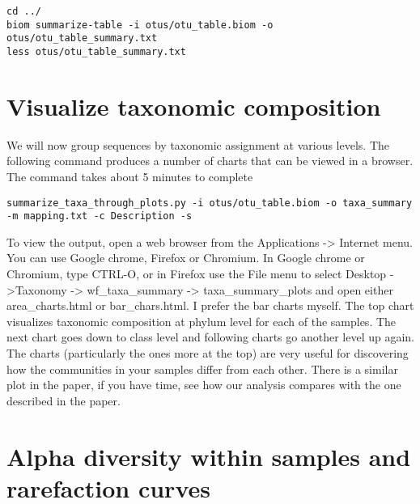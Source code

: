 \begin{steps}
\begin{lstlisting}
cd ../
biom summarize-table -i otus/otu_table.biom -o otus/otu_table_summary.txt
less otus/otu_table_summary.txt
\end{lstlisting}
\end{steps}

\section{Visualize taxonomic composition}
We will now group sequences by taxonomic assignment at various levels. The following command produces a number of charts that can be viewed in a browser. The command takes about 5 minutes to complete

\begin{steps}

\begin{lstlisting}
summarize_taxa_through_plots.py -i otus/otu_table.biom -o taxa_summary -m mapping.txt -c Description -s
\end{lstlisting}
\end{steps}

\begin{steps}
To view the output, open a web browser from the Applications -> Internet menu. You can use Google chrome, Firefox or Chromium.
In Google chrome or Chromium, type CTRL-O, or in Firefox use the File menu to select Desktop ->Taxonomy -> wf\_taxa\_summary -> taxa\_summary\_plots and open either area\_charts.html or bar\_chars.html. I prefer the bar charts myself. The top chart visualizes taxonomic composition at phylum level for each of the samples. The next chart goes down to class level and following charts go another level up again. The charts (particularly the ones more at the top) are very useful for discovering how the communities in your samples differ from each other. There is a similar plot in the paper, if you have time, see how our analysis compares with the one described in the paper.

\end{steps}

\section{Alpha diversity within samples and rarefaction curves}

